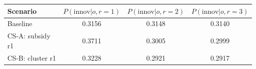 \begin{tabular}{lccc}
\hline
Scenario & $P(\text{innov}|o,r{=}1)$ & $P(\text{innov}|o,r{=}2)$ & $P(\text{innov}|o,r{=}3)$ \\
\hline
Baseline & 0.3156 & 0.3148 & 0.3140 \\
CS-A: subsidy r1 & 0.3711 & 0.3005 & 0.2999 \\
CS-B: cluster r1 & 0.3228 & 0.2921 & 0.2917 \\
\hline
\end{tabular}